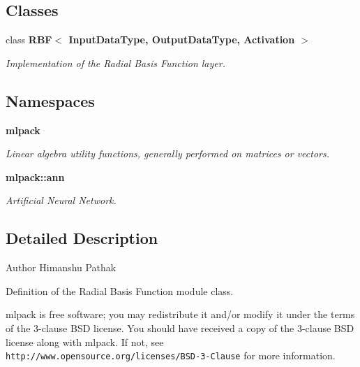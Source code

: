 \subsection*{Classes}
\begin{DoxyCompactItemize}
\item 
class \textbf{ R\+B\+F$<$ Input\+Data\+Type, Output\+Data\+Type, Activation $>$}
\begin{DoxyCompactList}\small\item\em Implementation of the Radial Basis Function layer. \end{DoxyCompactList}\end{DoxyCompactItemize}
\subsection*{Namespaces}
\begin{DoxyCompactItemize}
\item 
 \textbf{ mlpack}
\begin{DoxyCompactList}\small\item\em Linear algebra utility functions, generally performed on matrices or vectors. \end{DoxyCompactList}\item 
 \textbf{ mlpack\+::ann}
\begin{DoxyCompactList}\small\item\em Artificial Neural Network. \end{DoxyCompactList}\end{DoxyCompactItemize}


\subsection{Detailed Description}
\begin{DoxyAuthor}{Author}
Himanshu Pathak
\end{DoxyAuthor}
Definition of the Radial Basis Function module class.

mlpack is free software; you may redistribute it and/or modify it under the terms of the 3-\/clause B\+SD license. You should have received a copy of the 3-\/clause B\+SD license along with mlpack. If not, see {\tt http\+://www.\+opensource.\+org/licenses/\+B\+S\+D-\/3-\/\+Clause} for more information. 